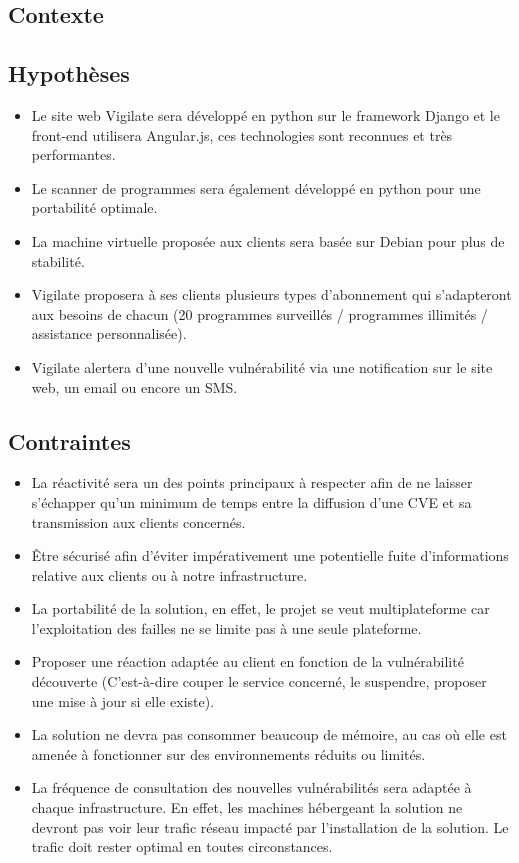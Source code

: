 \textcolor{myBlue}{\chapter{Contexte}}
\section{Hypothèses}
\begin{itemize}
\item Le site web Vigilate sera développé en python sur le framework Django et le front-end utilisera Angular.js, ces technologies sont reconnues et très performantes.\\
\item Le scanner de programmes sera également développé en python pour une portabilité optimale.\\
\item La machine virtuelle proposée aux clients sera basée sur Debian pour plus de stabilité.\\
\item Vigilate proposera à ses clients plusieurs types d'abonnement qui s'adapteront aux besoins de chacun (20 programmes surveillés / programmes illimités / assistance personnalisée).\\
\item Vigilate alertera d'une nouvelle vulnérabilité via une notification sur le site web, un email ou encore un SMS.\\
\end{itemize}
\section{Contraintes}
\begin{itemize}
\item La réactivité sera un des points principaux à respecter afin de ne laisser s’échapper qu’un minimum de temps entre la diffusion d’une CVE et sa transmission aux clients concernés.\\
\item Être sécurisé afin d’éviter impérativement une potentielle fuite d’informations relative aux clients ou à notre infrastructure.\\
\item La portabilité de la solution, en effet, le projet se veut multiplateforme car l’exploitation des failles ne se limite pas à une seule plateforme.\\
\item Proposer une réaction adaptée au client en fonction de la vulnérabilité découverte (C’est-à-dire couper le service concerné, le suspendre, proposer une mise à jour si elle existe).\\
\item La solution ne devra pas consommer beaucoup de mémoire, au cas où elle est amenée à fonctionner sur des environnements réduits ou limités.\\
\item La fréquence de consultation des nouvelles vulnérabilités sera adaptée à chaque infrastructure. En effet, les machines hébergeant la solution ne devront pas voir leur trafic réseau impacté par l’installation de la solution. Le trafic doit rester optimal en toutes circonstances.
\end{itemize}